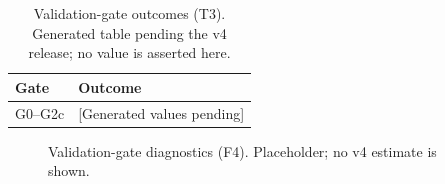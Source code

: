 \begin{table}[t]
\caption{Validation-gate outcomes (T3). Generated table pending the v4 release; no value is asserted here.}\label{tab:v4-T3}
\centering\begin{tabular}{ll}\hline
Gate & Outcome \\\hline
G0--G2c & [Generated values pending] \\\hline
\end{tabular}
\end{table}
\begin{figure}[t]
\centering{}
\caption{Validation-gate diagnostics (F4). Placeholder; no v4 estimate is shown.}\label{fig:v4-F4}
\end{figure}
